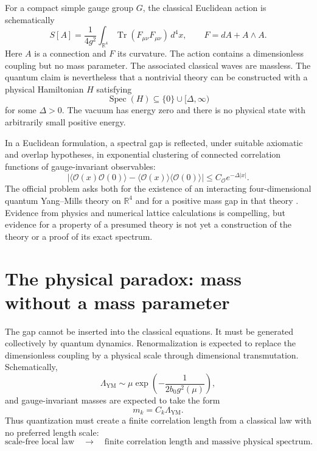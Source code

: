 \documentclass[11pt]{article}
\newcommand{\YM}{\mathrm{YM}}
\newcommand{\Spec}{\operatorname{Spec}}
\newcommand{\Tr}{\operatorname{Tr}}
\newcommand{\R}{\mathbb{R}}
\newcommand{\cO}{\mathcal{O}}
\begin{document}
For a compact simple gauge group $G$, the classical Euclidean action is
schematically
\begin{equation}
  S[A]
  =\frac{1}{4g^{2}}
    \int_{\R^{4}}\Tr\!\left(F_{\mu\nu}F_{\mu\nu}\right)\,d^{4}x,
  \qquad
  F=dA+A\wedge A .
  \label{eq:ym-action}
\end{equation}
Here $A$ is a connection and $F$ its curvature.  The action contains a
dimensionless coupling but no mass parameter.  The associated classical waves
are massless.  The quantum claim is nevertheless that a nontrivial theory can
be constructed with a physical Hamiltonian $H$ satisfying
\begin{equation}
  \Spec(H)\subseteq \{0\}\cup[\Delta,\infty)
  \label{eq:spectral-gap}
\end{equation}
for some $\Delta>0$.  The vacuum has energy zero and there is no physical state
with arbitrarily small positive energy.

In a Euclidean formulation, a spectral gap is reflected, under suitable
axiomatic and overlap hypotheses, in exponential clustering of connected
correlation functions of gauge-invariant observables:
\begin{equation}
  \left|
    \langle \cO(x)\cO(0)\rangle
    -\langle \cO(x)\rangle\langle \cO(0)\rangle
  \right|
  \leq C_{\cO}e^{-\Delta |x|}.
  \label{eq:clustering}
\end{equation}
The official problem asks both for the existence of an interacting
four-dimensional quantum Yang--Mills theory on $\R^{4}$ and for a positive mass
gap in that theory \cite{jaffe-witten,clay-overview}.  Evidence from physics and
numerical lattice calculations is compelling, but evidence for a property of a
presumed theory is not yet a construction of the theory or a proof of its exact
spectrum.

\section{The physical paradox: mass without a mass parameter}

The gap cannot be inserted into the classical equations.  It must be generated
collectively by quantum dynamics.  Renormalization is expected to replace the
dimensionless coupling by a physical scale through dimensional transmutation.
Schematically,
\begin{equation}
  \Lambda_{\YM}
  \sim
  \mu\exp\!\left(-\frac{1}{2b_{0}g^{2}(\mu)}\right),
  \label{eq:dimensional-transmutation}
\end{equation}
and gauge-invariant masses are expected to take the form
\begin{equation}
  m_{k}=C_{k}\Lambda_{\YM}.
\end{equation}
Thus quantization must create a finite correlation length from a classical law
with no preferred length scale:
\begin{equation}
  \text{scale-free local law}
  \quad\longrightarrow\quad
  \text{finite correlation length and massive physical spectrum}.
  \label{eq:emergence}
\end{equation}
\end{document}
